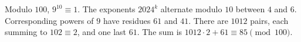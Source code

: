 Modulo $100$, $9^{10}\equiv1$. The exponents $2024^k$ alternate modulo $10$ between $4$ and $6$. Corresponding powers of $9$ have residues $61$ and $41$. There are $1012$ pairs, each summing to $102\equiv2$, and one last $61$. The sum is $1012\cdot2+61\equiv\boxed{85}\pmod{100}$.
